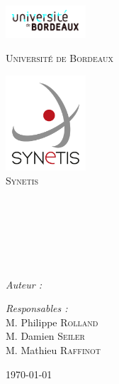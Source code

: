 
\begin{titlepage}

\begin{center}

\begin{minipage}[t]{0.48\textwidth}
  \begin{flushleft}
    \includegraphics [width=30mm]{images/logo-univ.jpg} \\[0.5cm]
    \begin{spacing}{1.5}
      \textsc{\LARGE Université de Bordeaux}
    \end{spacing}
  \end{flushleft}
\end{minipage}
\begin{minipage}[t]{0.48\textwidth}
  \begin{flushright}
    \includegraphics [width=30mm]{images/mini_logo_synetis.png} \\[0.5cm]
    \textsc{\LARGE Synetis}
  \end{flushright}
\end{minipage} \\[1.5cm]

\textsc{\Large \reportsubject}\\[0.5cm]
\HRule \\[0.4cm]
{\huge \bfseries \reporttitle}\\[0.4cm]
\HRule \\[1.5cm]

\begin{minipage}[t]{0.3\textwidth}
  \begin{flushleft} \large
    \emph{Auteur :}\\
    \reportauthor
  \end{flushleft}
\end{minipage}
\begin{minipage}[t]{0.6\textwidth}
  \begin{flushright} \large
    \emph{Responsables :} \\
    M. Philippe \textsc{Rolland} \\
    M. Damien \textsc{Seiler} \\
    M. Mathieu \textsc{Raffinot}
  \end{flushright}
\end{minipage}

\vfill

{\large \today}

\end{center}

\end{titlepage}
